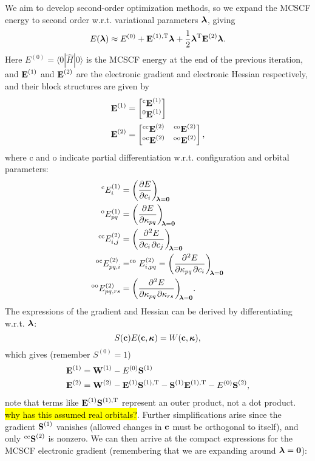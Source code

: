 \documentclass{article}
\begin{document}
We aim to develop second-order optimization methods, so we expand the MCSCF energy to second order w.r.t. variational parameters $\bm{\mathrm{\lambda}}$, giving
\begin{equation}
E(\bm{\mathrm{\lambda}})\approx E^{(0)}+\bm{\mathrm{E}}^{(1),\mathrm{T}}\bm{\mathrm{\lambda}}+\frac{1}{2}\bm{\mathrm{\lambda}}^{\mathrm{T}}\bm{\mathrm{E}}^{(2)}\bm{\mathrm{\lambda}}.
\end{equation}
Here $E^{(0)}=\langle 0|\hat{H}|0\rangle$ is the MCSCF energy at the end of the previous iteration, and $\bm{\mathrm{E}}^{(1)}$ and $\bm{\mathrm{E}}^{(2)}$ are the electronic gradient and electronic Hessian respectively, and their block structures are given by
\begin{align}
\bm{\mathrm{E}}^{(1)}&=\begin{bmatrix}{^{\mathrm{c}}\bm{\mathrm{E}}^{(1)}}\\{^{\mathrm{0}}\bm{\mathrm{E}}^{(1)}}\end{bmatrix} \\
\bm{\mathrm{E}}^{(2)}&=\begin{bmatrix}{^{\mathrm{cc}}\bm{\mathrm{E}}^{(2)}}&{^{\mathrm{co}}\bm{\mathrm{E}}^{(2)}}\\{^{\mathrm{oc}}\bm{\mathrm{E}}^{(2)}}&{^{\mathrm{oo}}\bm{\mathrm{E}}^{(2)}}\end{bmatrix},
\end{align}
where c and o indicate partial differentiation w.r.t. configuration and orbital parameters:
\begin{align}
^{\mathrm{c}}E^{(1)}_i&=\diffp{E}{c_i}[\bvec{\lambda}=\bvec{0}]\\
^{\mathrm{o}}E^{(1)}_{pq}&=\diffp{E}{\kappa_{pq}}[\bvec{\lambda}=\bvec{0}]\\
^{\mathrm{cc}}E^{(2)}_{i,j}&=\diffp{E}{c_i,c_j}[\bvec{\lambda}=\bvec{0}]\\
^{\mathrm{oc}}E^{(2)}_{pq,i}&=^{\mathrm{co}}E^{(2)}_{i,pq}=\diffp{E}{\kappa_{pq},c_i}[\bvec{\lambda}=\bvec{0}]\\
^{\mathrm{oo}}E^{(2)}_{pq,rs}&=\diffp{E}{\kappa_{pq},\kappa_{rs}}[\bvec{\lambda}=\bvec{0}].
\end{align}
The expressions of the gradient and Hessian can be derived by differentiating w.r.t. $\bm{\mathrm{\lambda}}$:
\begin{equation}
S(\bm{\mathrm{c}})E(\bm{\mathrm{c}},\bm{\mathrm{\kappa}})=W(\bm{\mathrm{c}},\bm{\mathrm{\kappa}}),
\end{equation}
which gives (remember $S^{(0)}=1$)
\begin{align}
\bm{\mathrm{E}}^{(1)}&=\bm{\mathrm{W}}^{(1)}-E^{(0)}\bm{\mathrm{S}}^{(1)}\\
\bm{\mathrm{E}}^{(2)}&=\bm{\mathrm{W}}^{(2)}-\bm{\mathrm{E}}^{(1)}\bm{\mathrm{S}}^{(1),\mathrm{T}}-\bm{\mathrm{S}}^{(1)}\bm{\mathrm{E}}^{(1),\mathrm{T}}-E^{(0)}\bm{\mathrm{S}}^{(2)},
\end{align}
note that terms like $\bm{\mathrm{E}}^{(1)}\bm{\mathrm{S}}^{(1),\mathrm{T}}$ represent an outer product, not a dot product. \hl{why has this assumed real orbitals?}. Further simplifications arise since the gradient $\bm{\mathrm{S}}^{(1)}$ vanishes (allowed changes in $\bm{\mathrm{c}}$ must be orthogonal to itself), and only $^{\mathrm{cc}}\bm{\mathrm{S}}^{(2)}$ is nonzero. We can then arrive at the compact expressions for the MCSCF electronic gradient (remembering that we are expanding around $\bm{\mathrm{\lambda}}=\bm{\mathrm{0}}$):
\end{document}
